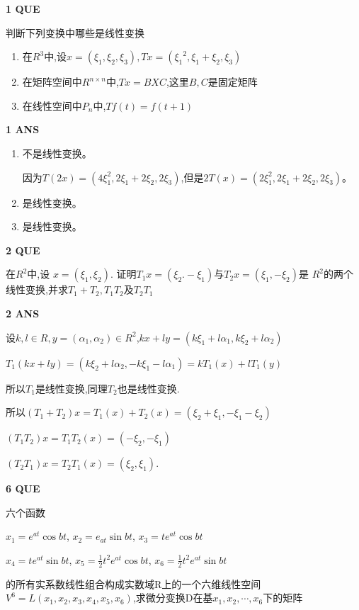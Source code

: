 \documentclass[11pt,letterpaper]{ctexart}
\begin{document}
\begin{enumerate}
\textbf{1 QUE}
\bigskip

判断下列变换中哪些是线性变换

\begin{enumerate}
	\item 在$R^3$中,设$x = (\xi_1, \xi_2, \xi_3), Tx = ({\xi_1}^2,{\xi_1} + {\xi_2},\xi_3)$
    \item 在矩阵空间中$R^{n \times n}$中,$Tx = BXC$,这里$B,C$是固定矩阵
    \item 在线性空间中$P_n$中,$Tf(t) = f(t + 1)$
\end{enumerate}


\textbf{1 ANS}
\bigskip

\begin{enumerate}
	\item 不是线性变换。
	
	因为${T(2x) = (4\xi_1^2, 2\xi_1 + 2\xi_2, 2\xi_3)}$,但是${2T(x) = (2\xi_1^2, 2\xi_1+ 2\xi_2, 2\xi_3)}$。
    \item 是线性变换。
    \item 是线性变换。
\end{enumerate}


\textbf{2 QUE}
\bigskip

在$R^2$中,设 $x = (\xi_1, \xi_2)$. 证明$T_1x = (\xi_2. -\xi_1)$与$T_2x = (\xi_1,-\xi_2)$是 $R^2$的两个线性变换,并求$T_1 + T_2, T_1T_2$及$T_2T_1$ 


\textbf{2 ANS}
\bigskip

	设${k,l \in R, y = (\alpha_1, \alpha_2)\in R^2}$,$kx + ly = (k\xi_1 + l\alpha_1, k\xi_2 + l\alpha_2)$
	
	${T_1(kx + ly) = (k\xi_2 + l\alpha_2,-k\xi_1 - l\alpha_1) = kT_1(x) + lT_1(y)}$

	所以$T_1$是线性变换,同理$T_2$也是线性变换.

	所以${(T_1 + T_2)x = T_1(x) + T_2(x) = (\xi_2 + \xi_1, -\xi_1 - \xi_2)}$

	${(T_1T_2)x = T_1T_2(x) = (-\xi_2, -\xi_1)}$

	${(T_2T_1)x = T_2T_1(x) = (\xi_2, \xi_1)}$.


\textbf{6 QUE}
\bigskip

六个函数

    $x_1 = e^{at} \cos{b} t$, \quad $x_2 = e_{at}\sin{b}t$, \quad $x_3 = t e^{at}\cos{b}t$

    $x_4 = t e^{at} \sin{b} t$, \quad $x_5 = \frac{1}{2} t^2 e^{at} \cos{b} t$, \quad $x_6 =  \frac{1}{2} t^2 e^{at}\sin{b}t$

    的所有实系数线性组合构成实数域R上的一个六维线性空间$V^6 = L(x_1, x_2,x_3,x_4,x_5,x_6)$,求微分变换D在基$x_1,x_2, \cdots, x_6$下的矩阵


\end{enumerate}
\end{document}
